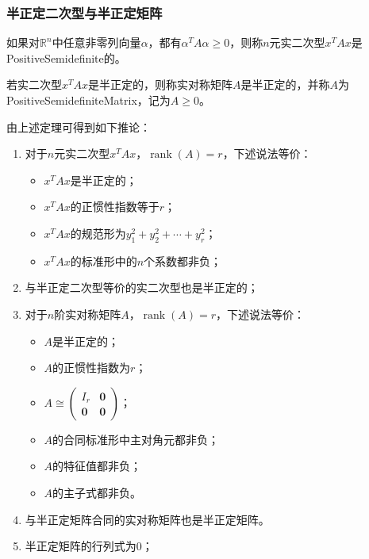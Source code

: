 \subsubsection{半正定二次型与半正定矩阵}
\begin{definition}
	如果对$\mathbb{R}^{n}$中任意非零列向量$\alpha$，都有$\alpha^TA\alpha\geqslant0$，则称$n$元实二次型$x^TAx$是\gls{PositiveSemidefinite}的。
\end{definition}
\begin{definition}
	若实二次型$x^TAx$是半正定的，则称实对称矩阵$A$是半正定的，并称$A$为\gls{PositiveSemidefiniteMatrix}，记为$A\geqslant0$。
\end{definition}
\begin{theorem}\label{theo:PositiveSemidefinite}
	由上述定理可得到如下推论：
	\begin{enumerate}
		\item 对于$n$元实二次型$x^TAx$，$\operatorname{rank}(A)=r$，下述说法等价：
		\begin{itemize}
			\item $x^TAx$是半正定的；
			\item $x^TAx$的正惯性指数等于$r$；
			\item $x^TAx$的规范形为$y_1^2+y_2^2+\cdots+y_r^2$；
			\item $x^TAx$的标准形中的$n$个系数都非负；
		\end{itemize}
		\item 与半正定二次型等价的实二次型也是半正定的；
		\item 对于$n$阶实对称矩阵$A$，$\operatorname{rank}(A)=r$，下述说法等价：
		\begin{itemize}
			\item $A$是半正定的；
			\item $A$的正惯性指数为$r$；
			\item $A\cong
			\begin{pmatrix}
				I_r & \mathbf{0} \\
				\mathbf{0} & \mathbf{0}
			\end{pmatrix}$；
			\item $A$的合同标准形中主对角元都非负；
			\item $A$的特征值都非负；
			\item $A$的主子式都非负。
		\end{itemize}
		\item 与半正定矩阵合同的实对称矩阵也是半正定矩阵。
		\item 半正定矩阵的行列式为$0$；
	\end{enumerate}
\end{theorem}

